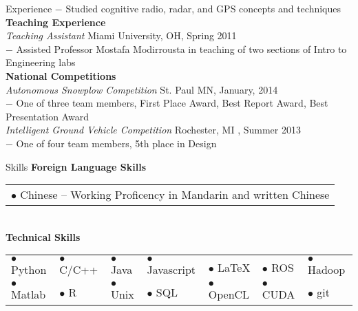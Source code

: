 \documentclass{resume} %
\begin{document}
\begin{rSection}{Experience}
  $-$ Studied cognitive radio, radar, and GPS concepts and techniques \\[3 mm]
%
  \textbf{Teaching Experience}\\
  \textit{Teaching Assistant} \hfill Miami University, OH, Spring 2011 \\
  $-$ Assisted Professor Mostafa Modirrousta in teaching of two sections of Intro to Engineering labs\\[3 mm]
%
  \textbf{National Competitions}\\
  \textit{Autonomous Snowplow Competition} \hfill St. Paul MN, January, 2014 \\
  $-$ One of three team members, First Place Award, Best Report Award, Best Presentation Award\\
  \textit{Intelligent Ground Vehicle Competition} \hfill Rochester, MI , Summer 2013 \\
  $-$ One of four team members, 5th place in Design
\end{rSection}
\begin{rSection}{Skills}
  \textbf{Foreign Language Skills}\\[1 mm]
  \begin{tabular}{l}
    $\bullet$ Chinese --  Working Proficency in Mandarin and written Chinese\\
  \end{tabular}\\
  \textbf{Technical Skills}\\[1 mm]
  \begin{tabular}{lllllll}
     $\bullet$ Python   &  $\bullet$ C/C++ &  $\bullet$ Java  & $\bullet$ Javascript &  $\bullet$ \LaTeX   &  $\bullet$ ROS    &  $\bullet$ Hadoop\\
     $\bullet$ Matlab   &  $\bullet$ R     &   $\bullet$ Unix   & $\bullet$ SQL      &  $\bullet$ OpenCL  &  $\bullet$ CUDA   &   $\bullet$ git\\
  \end{tabular}\\[1 mm]
\end{rSection}
\end{document}
